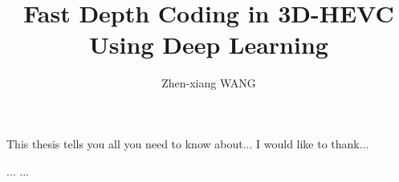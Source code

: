 \documentclass{report}
\begin{document}
    \title{Fast Depth Coding in 3D-HEVC\\
    Using Deep Learning}
    \author{Zhen-xiang WANG}
    \beforepreface
    This thesis tells you all you need to know about...
    I would like to thank...
    \afterpreface

    
    ...
    ...
    \printbibliography[heading=bibintoc]
\end{document}
